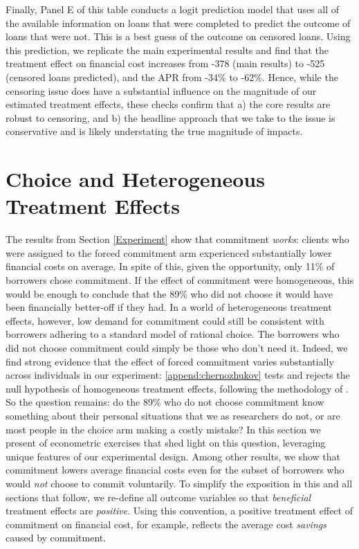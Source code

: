 \documentclass[oneside,11pt]{article}
\begin{document}
Finally, Panel E of this table conducts a logit prediction model that uses all of the available information on loans that were completed to predict the outcome of loans that were not.  This is a best guess of the outcome on censored loans.  Using this prediction, we replicate the main experimental results and find that the treatment effect on financial cost increases from -378 (main results) to -525 (censored loans predicted), and the APR from -34\% to -62\%.  Hence, while the censoring issue does have a substantial influence on the magnitude of our estimated treatment effects, these  checks confirm that a) the core results are robust to censoring, and b) the headline approach that we take to the issue is conservative and is likely understating the true magnitude of impacts.





\section{Choice and Heterogeneous Treatment Effects}
\label{Choice}

The results from Section \ref{Experiment} show that commitment \emph{works}: clients who were assigned to the forced commitment arm experienced substantially lower financial costs on average.
In spite of this, given the opportunity, only 11\% of borrowers chose commitment. 
If the effect of commitment were homogeneous, this would be enough to conclude that the 89\% who did not choose it would have been financially better-off if they had.
In a world of heterogeneous treatment effects, however, low demand for commitment could still be consistent with borrowers adhering to a standard model of rational choice. 
The borrowers who did not choose commitment could simply be those who don't need it. 
Indeed, we find strong evidence that the effect of forced commitment varies substantially across individuals in our experiment: \ref{append:chernozhukov} tests and rejects the null hypothesis of homogeneous treatment effects, following the methodology of \cite{chernozhukov2018generic}.
So the question remains: do the 89\% who do not choose commitment know something about their personal situations that we as researchers do not, or are most people in the choice arm making a costly mistake? 
In this section we present of econometric exercises that shed light on this question, leveraging unique features of our experimental design. 
Among other results, we show that commitment lowers average financial costs even for the subset of borrowers who would \emph{not} choose to commit voluntarily.
To simplify the exposition in this and all sections that follow, we re-define all outcome variables so that \emph{beneficial} treatment effects are \emph{positive}. Using this convention, a positive treatment effect of commitment on financial cost, for example, reflects the average cost \emph{savings} caused by commitment.
\end{document}

